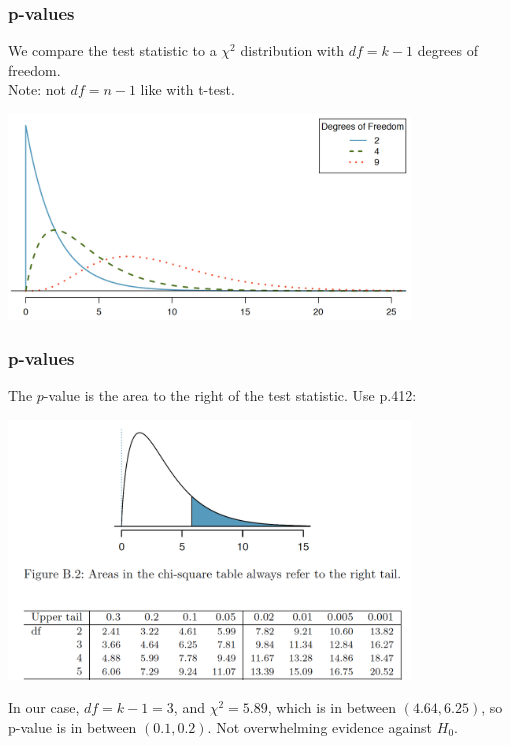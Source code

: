 \documentclass[slides]{beamer}
\newcommand{\blue}[1]{\textcolor{blue2}{#1}}
\begin{document}
\begin{frame}[fragile]
\frametitle{p-values}
We compare the test statistic to a $\chi^2$ distribution with $df=k-1$ degrees of freedom.\\  Note: not $df=n-1$ like with t-test.  

\vspace{0.25cm}

\begin{center}
\includegraphics[width=0.8\textwidth]{figure/chi.png}
\end{center}

\end{frame}


\begin{frame}[fragile]
\frametitle{p-values}
The $p$-value is the \blue{area to the right} of the test statistic.  Use p.412:
\begin{center}
\includegraphics[width=0.8\textwidth]{figure/table.png}
\end{center}
%
%
\pause In our case, $df=k-1=3$, and $\chi^2=5.89$, which is in between $(4.64, 6.25)$, so p-value is in between $(0.1, 0.2)$.  Not overwhelming evidence against $H_0$.

\end{frame}
\end{document}
